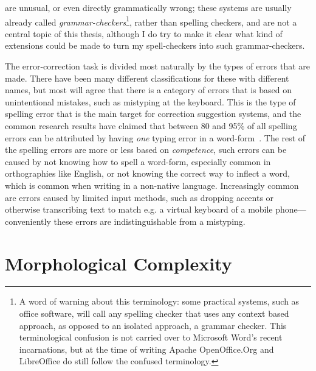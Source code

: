 \documentclass[officiallayout,final]{unihelcompling}
\begin{document}
are unusual, or even directly grammatically wrong; these systems are usually
already called \emph{\glspl{grammar-checker}}\footnote{A word of warning about this
    terminology: some practical systems, such as office software, will call any
    spelling checker that uses any context based approach, as opposed to an
    isolated approach, a grammar checker. This terminological confusion is not
    carried over to Microsoft Word's recent incarnations, but at the time of
writing Apache OpenOffice.Org and LibreOffice do still follow the confused
terminology.}, rather than spelling checkers, and are not a
central topic of this thesis, although I do try to make it clear what kind of
extensions could be made to turn my spell-checkers into such grammar-checkers.

The error-correction task is divided most naturally by the types of errors that
are made. There have been many different classifications for these with
different names, but most will agree that there is a category of errors that is
based on unintentional mistakes, such as mistyping at the keyboard. This is the
type of spelling error that is the main target for correction suggestion
systems, and the common research results have claimed that between 80 and 95\%
of all spelling errors can be attributed by having \emph{one} typing error in a
word-form~\citep{kukich1992techniques}. The rest of the spelling errors are
more or less based on \emph{competence}, such errors can be caused by not
knowing how to spell a word-form, especially common in orthographies like
English, or not knowing the correct way to inflect a word, which is common when
writing in a non-native language. Increasingly common are errors caused by
limited input methods, such as dropping accents or otherwise transcribing text
to match e.g.  a virtual keyboard of a mobile phone---conveniently these errors
are indistinguishable from a mistyping.



\section{Morphological Complexity}
\label{sec:morphological-complexity}
\end{document}
